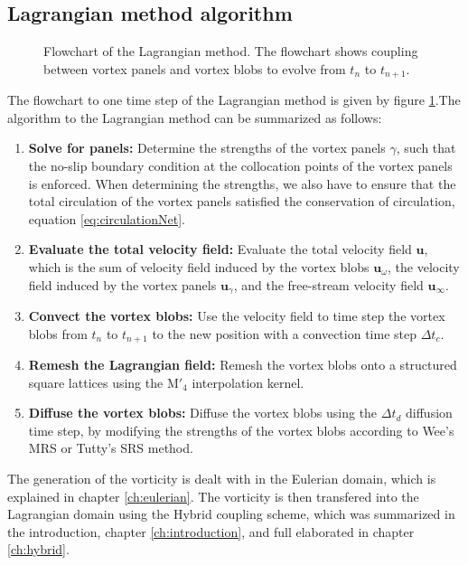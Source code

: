 \subsection*{Lagrangian method algorithm}

	\begin{figure}[!t]
		\centering
		\caption{Flowchart of the Lagrangian method. The flowchart shows coupling between vortex panels and vortex blobs to evolve from $t_n$ to $t_{n+1}$.}
		\label{fig:flowchart_lagrangian}
	\end{figure}
	
The flowchart to one time step of the Lagrangian method is given by figure \ref{fig:flowchart_lagrangian}.The algorithm to the Lagrangian method can be summarized as follows:
	\begin{enumerate}
	\item \textbf{Solve for panels:} Determine the strengths of the vortex panels $\gamma$, such that the no-slip boundary condition at the collocation points of the vortex panels is enforced. When determining the strengths, we also have to ensure that the total circulation of the vortex panels satisfied the conservation of circulation, equation \ref{eq:circulationNet}.
	\item \textbf{Evaluate the total velocity field:} Evaluate the total velocity field $\mathbf{u}$, which is the sum of velocity field induced by the vortex blobs $\mathbf{u}_{\omega}$, the velocity field induced by the vortex panels $\mathbf{u}_{\gamma}$, and the free-stream velocity field $\mathbf{u}_{\infty}$. 
	\item \textbf{Convect the vortex blobs:} Use the velocity field to time step the vortex blobs from $t_n$ to $t_{n+1}$ to the new position with a convection time step $\Delta t_c$.
	\item \textbf{Remesh the Lagrangian field:} Remesh the vortex blobs onto a structured square lattices using the $\mathrm{M}'_4$ interpolation kernel.
	\item \textbf{Diffuse the vortex blobs:} Diffuse the vortex blobs using the $\Delta t_d$ diffusion time step, by modifying the strengths of the vortex blobs according to Wee's MRS or Tutty's SRS method.
	\end{enumerate}

The generation of the vorticity is dealt with in the Eulerian domain, which is explained in chapter \ref{ch:eulerian}. The vorticity is then transfered into the Lagrangian domain using the Hybrid coupling scheme, which was summarized in the introduction, chapter \ref{ch:introduction}, and full elaborated in chapter \ref{ch:hybrid}.

